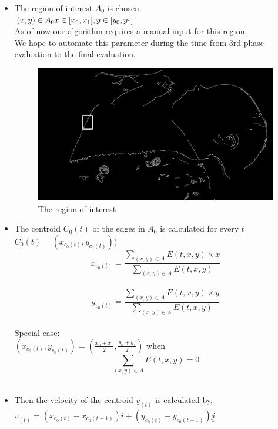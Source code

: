 \documentclass{report}
\begin{document}
\begin{itemize}
    
    \item The region of interest $A_0$ is chosen.\\
    $(x,y) \in A_0 \\x\in [ x_{0},x_{1} ] , y\in [ y_{0},y_{1} ]$\\
    As of now our algorithm requires a manual input for this region.\\We hope to automate this parameter during the time from 3rd phase evaluation to the final evaluation.\\
    
    \begin{figure}[H]
        \centering
        \includegraphics[keepaspectratio,scale=0.25]{video03.png}
        \caption{The region of interest}
        \label{fig:my_label}
    \end{figure}
    
    \item The centroid $C_{0}(t)$ of the edges in $A_0$ is calculated for every $t$\\
    $C_0(t)=(x_{c_0(t)},y_{c_0(t)}))$\\
    $$x_{c_0(t)} =\frac{ \sum _{(x,y) \in A} E(t,x,y) \times x}{ \sum _{(x,y) \in A} E(t,x,y)}$$\\
    $$y_{c_0(t)} =\frac{ \sum _{(x,y) \in A} E(t,x,y) \times y}{ \sum _{(x,y) \in A} E(t,x,y)}$$\\
    Special case:\\
    $(x_{c_0(t)},y_{c_0(t)})=(\frac{x_0 + x_1}{2},\frac{y_0 + y_1}{2})$ when $$\sum _{(x,y) \in A} E(t,x,y)  =0$$\\
    
    \item Then the velocity of the centroid $\underline{v}_{(t)}$ is calculated by,\\
    $\underline{v}_{(t)} =(x_{c_0(t)}-x_{c_0(t-1)})\underline{i} + (y_{c_0(t)}-y_{c_0(t-1)})\underline{j} $
    

\end{itemize}
\end{document}
